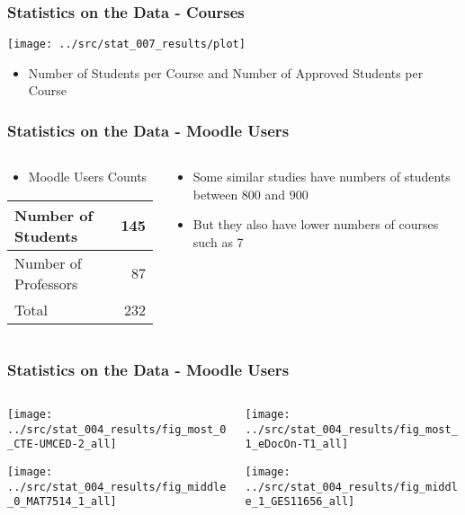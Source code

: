 \begin{frame}
\frametitle{Statistics on the Data - Courses}

\centering
\texttt{[image: ../src/stat\_007\_results/plot]}

\begin{itemize}
    \item {\color{gray} Number of Students per Course} and {\color{blue} Number of Approved Students per Course}
\end{itemize}
\end{frame}

\begin{frame}
\frametitle{Statistics on the Data - Moodle Users}

\begin{columns}[T] %
\begin{column}{.48\textwidth}
    \begin{itemize}
        \item Moodle Users Counts
    \end{itemize}

    \begin{tabular}{| l | r |}
        \hline
        Number of Students   & 145 \\ \hline
        Number of Professors & 87  \\ \hline
        Total                & 232 \\ \hline
    \end{tabular}
\end{column}%
\hfill%
\begin{column}{.48\textwidth}
    \begin{itemize}
        \item Some similar studies have numbers of students between 800 and 900
        \item But they also have lower numbers of courses such as 7
    \end{itemize}
\end{column}%
\end{columns}
\end{frame}

\begin{frame}
\frametitle{Statistics on the Data - Moodle Users}


\begin{columns}[T] %
\begin{column}{.48\textwidth}
    \texttt{[image: ../src/stat\_004\_results/fig\_most\_0\_CTE-UMCED-2\_all]}

    \texttt{[image: ../src/stat\_004\_results/fig\_middle\_0\_MAT7514\_1\_all]}
\end{column}%
\hfill%
\begin{column}{.48\textwidth}
    \texttt{[image: ../src/stat\_004\_results/fig\_most\_1\_eDocOn-T1\_all]}

    \texttt{[image: ../src/stat\_004\_results/fig\_middle\_1\_GES11656\_all]}
\end{column}%
\end{columns}
\end{frame}

